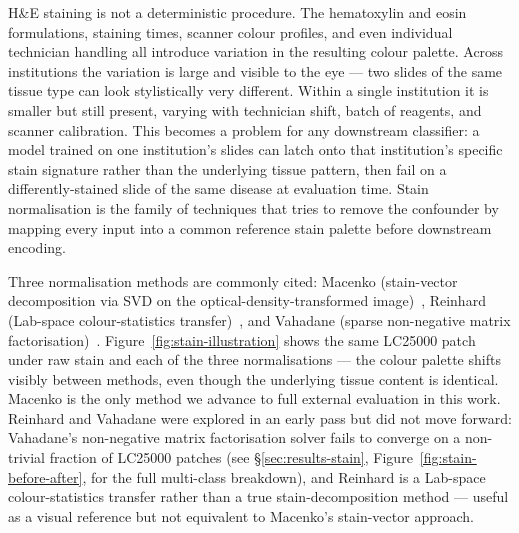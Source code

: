 H\&E staining is not a deterministic procedure. The hematoxylin and eosin formulations, staining times, scanner colour profiles, and even individual technician handling all introduce variation in the resulting colour palette. Across institutions the variation is large and visible to the eye --- two slides of the same tissue type can look stylistically very different. Within a single institution it is smaller but still present, varying with technician shift, batch of reagents, and scanner calibration. This becomes a problem for any downstream classifier: a model trained on one institution's slides can latch onto that institution's specific stain signature rather than the underlying tissue pattern, then fail on a differently-stained slide of the same disease at evaluation time. Stain normalisation is the family of techniques that tries to remove the confounder by mapping every input into a common reference stain palette before downstream encoding.

Three normalisation methods are commonly cited: Macenko (stain-vector decomposition via SVD on the optical-density-transformed image)~\cite{macenko2009stain}, Reinhard (Lab-space colour-statistics transfer)~\cite{reinhard2001color}, and Vahadane (sparse non-negative matrix factorisation)~\cite{vahadane2016structure}. Figure~\ref{fig:stain-illustration} shows the same LC25000 patch under raw stain and each of the three normalisations --- the colour palette shifts visibly between methods, even though the underlying tissue content is identical. Macenko is the only method we advance to full external evaluation in this work. Reinhard and Vahadane were explored in an early pass but did not move forward: Vahadane's non-negative matrix factorisation solver fails to converge on a non-trivial fraction of LC25000 patches (see §\ref{sec:results-stain}, Figure~\ref{fig:stain-before-after}, for the full multi-class breakdown), and Reinhard is a Lab-space colour-statistics transfer rather than a true stain-decomposition method --- useful as a visual reference but not equivalent to Macenko's stain-vector approach.

